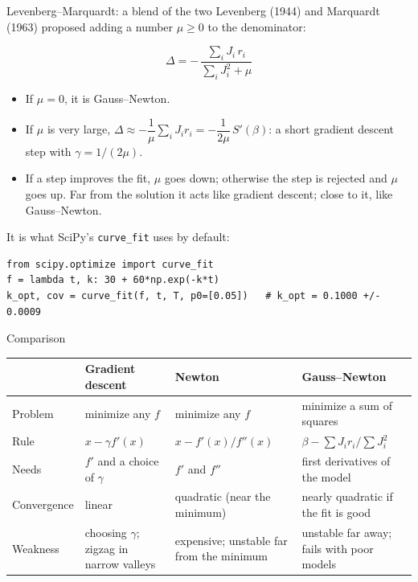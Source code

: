 \documentclass[aspectratio=169,10pt]{beamer}
\begin{document}
\begin{frame}[fragile]{Levenberg--Marquardt: a blend of the two}
  Levenberg (1944) and Marquardt (1963) proposed adding a number $\mu \ge 0$ to the denominator:
  \begin{ecuacion}
    \[ \Delta = -\,\frac{\sum_i J_i\, r_i}{\sum_i J_i^2 + \mu} \]
  \end{ecuacion}
  \begin{itemize}
    \item If $\mu = 0$, it is Gauss--Newton.
    \item If $\mu$ is very large, $\Delta \approx -\dfrac{1}{\mu}\sum_i J_i r_i = -\dfrac{1}{2\mu}\,S'(\beta)$: a short gradient descent step with $\gamma = 1/(2\mu)$.
    \item If a step improves the fit, $\mu$ goes down; otherwise the step is rejected and $\mu$ goes up. Far from the solution it acts like gradient descent; close to it, like Gauss--Newton.
  \end{itemize}
  It is what SciPy's \texttt{curve\_fit} uses by default:
\begin{lstlisting}
from scipy.optimize import curve_fit
f = lambda t, k: 30 + 60*np.exp(-k*t)
k_opt, cov = curve_fit(f, t, T, p0=[0.05])   # k_opt = 0.1000 +/- 0.0009
\end{lstlisting}
\end{frame}

\begin{frame}{Comparison}
  \centering\small
  \renewcommand{\arraystretch}{1.25}
  \begin{tabular}{>{\raggedright\arraybackslash}p{2.0cm}>{\raggedright\arraybackslash}p{3.4cm}>{\raggedright\arraybackslash}p{3.4cm}>{\raggedright\arraybackslash}p{3.4cm}}
    \toprule
    & \textcolor{cafe}{\textbf{Gradient descent}} & \textbf{Newton} & \textcolor{azul}{\textbf{Gauss--Newton}} \\
    \midrule
    Problem & minimize any $f$ & minimize any $f$ & minimize a sum of squares \\
    Rule & $x - \gamma f'(x)$ & $x - f'(x)/f''(x)$ & $\beta - \sum J_i r_i \big/ \sum J_i^2$ \\
    Needs & $f'$ and a choice of $\gamma$ & $f'$ and $f''$ & first derivatives of the model \\
    Convergence & linear & quadratic (near the minimum) & nearly quadratic if the fit is good \\
    Weakness & choosing $\gamma$; zigzag in narrow valleys & expensive; unstable far from the minimum & unstable far away; fails with poor models \\
    \bottomrule
  \end{tabular}
\end{frame}
\end{document}
